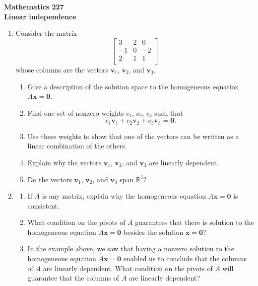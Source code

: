 \documentclass[12pt]{article}
\newcommand{\vs}[1]{\vspace{#1in}}
\newcommand{\vvec}{{\mathbf v}}
\newcommand{\xvec}{{\mathbf x}}
\newcommand{\zerovec}{{\mathbf 0}}
\newcommand{\real}{{\mathbb R}}
\begin{document}
\noindent
{\bf Mathematics 227} \\ 
{\bf Linear independence}

\bigskip
\begin{enumerate}
\item Consider the matrix
  $$
  \left[
    \begin{array}{ccc}
      3 & 2 & 0 \\
      -1 & 0 & -2 \\
      2 & 1 & 1 \\
    \end{array}
  \right]
  $$
  whose columns are the vectors $\vvec_1$, $\vvec_2$, and $\vvec_3$.

  \begin{enumerate}[label=(\alph*)]
  \item Give a description of the solution space to the homogeneous
    equation $A\xvec = \zerovec$.

    \vs{1.5}
  \item Find one set of nonzero weights $c_1$, $c_2$, $c_3$ such that
    $$
    c_1\vvec_1 + c_2\vvec_2 + c_3\vvec_3 = \zerovec.
    $$

    \vs{1}
  \item Use these weights to show that one of the vectors can be
    written as a linear combination of the others.

    \vs{1}

  \item Explain why the vectors $\vvec_1$, $\vvec_2$, and $\vvec_3$
    are linearly dependent.

    \vs{1}

  \item Do the vectors $\vvec_1$, $\vvec_2$, and $\vvec_3$ span
    $\real^3$?  

    \vs{1}

  \end{enumerate}

  \newpage
\item
  \begin{enumerate}[label=(\alph*)]
  \item If $A$ is any matrix, explain why the homogeneous equation
    $A\xvec=\zerovec$ is consistent.
    
    \vs{1}
  \item What condition on the pivots of $A$ guarantees that there is
    solution to the homogeneous equation $A\xvec=\zerovec$ besides the
    solution $\xvec=\zerovec$?
    
    \vs{1}
  \item In the example above, we saw that having a nonzero solution to
    the homogeneous equation $A\xvec=\zerovec$ enabled us to conclude
    that the columns of $A$ are linearly dependent.  What condition on
    the pivots of $A$ will guarantee that the columns of $A$ are
    linearly dependent?


\end{enumerate}
\end{enumerate}
\end{document}
